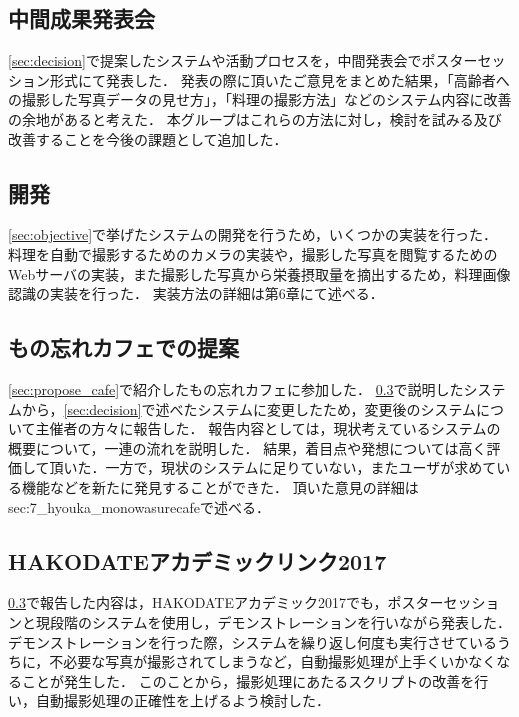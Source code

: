 \documentclass[../report]{subfiles}
\begin{document}
\subsection{中間成果発表会}
\ref{sec:decision}で提案したシステムや活動プロセスを，中間発表会でポスターセッション形式にて発表した．
発表の際に頂いたご意見をまとめた結果，「高齢者への撮影した写真データの見せ方」，「料理の撮影方法」などのシステム内容に改善の余地があると考えた．
本グループはこれらの方法に対し，検討を試みる及び改善することを今後の課題として追加した．

\subsection{開発}
\ref{sec:objective}で挙げたシステムの開発を行うため，いくつかの実装を行った．
料理を自動で撮影するためのカメラの実装や，撮影した写真を閲覧するためのWebサーバの実装，また撮影した写真から栄養摂取量を摘出するため，料理画像認識の実装を行った．
実装方法の詳細は第6章にて述べる．

\subsection{もの忘れカフェでの提案} \label{sec:propose_cafe2}
\ref{sec:propose_cafe}で紹介したもの忘れカフェに参加した．
\ref{sec:propose_cafe2}で説明したシステムから，\ref{sec:decision}で述べたシステムに変更したため，変更後のシステムについて主催者の方々に報告した．
報告内容としては，現状考えているシステムの概要について，一連の流れを説明した．
結果，着目点や発想については高く評価して頂いた．一方で，現状のシステムに足りていない，またユーザが求めている機能などを新たに発見することができた．
頂いた意見の詳細は{sec:7_hyouka_monowasurecafe}で述べる．

\subsection{HAKODATEアカデミックリンク2017}
\ref{sec:propose_cafe2}で報告した内容は，HAKODATEアカデミック2017でも，ポスターセッションと現段階のシステムを使用し，デモンストレーションを行いながら発表した．
デモンストレーションを行った際，システムを繰り返し何度も実行させているうちに，不必要な写真が撮影されてしまうなど，自動撮影処理が上手くいかなくなることが発生した．
このことから，撮影処理にあたるスクリプトの改善を行い，自動撮影処理の正確性を上げるよう検討した．
\end{document}
